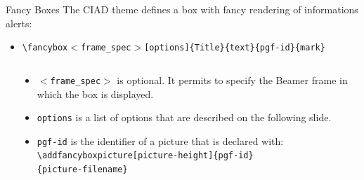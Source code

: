 \documentclass[english,sectioncirclenumberstyle]{ciadbeamer}
\begin{document}
\begin{frame}{Fancy Boxes}
	The CIAD theme defines a box with fancy rendering of informations alerts: \\
	\begin{itemize}
	\item \texttt{{\textbackslash}fancybox\ensuremath{<}frame\_spec\ensuremath{>}[options]\{Title\}\{text\}\{pgf-id\}\{mark\}} \\[.5cm]
	\end{itemize}
	\begin{columns}
		\begin{column}{.3\linewidth}
		\end{column}
		\begin{column}{.7\linewidth}
			\begin{itemize}
			\item \texttt{\ensuremath{<}frame\_spec\ensuremath{>}} is optional. It permits to specify the Beamer frame in which the box is displayed.
			\item \texttt{options} is a list of options that are described on the following slide.
			\item \texttt{pgf-id} is the identifier of a picture that is declared with: \\
				\texttt{{\textbackslash}addfancyboxpicture[picture-height]\{pgf-id\}} \\
				\texttt{\{picture-filename\}}
			\end{itemize}
		\end{column}
	\end{columns}
\end{frame}
\end{document}
